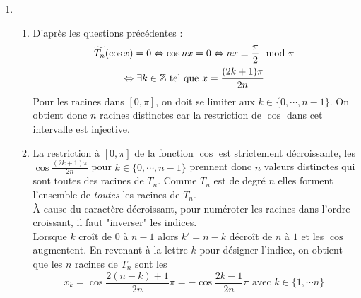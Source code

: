 \begin{enumerate}
\begin{enumerate}
\end{enumerate}
\item \begin{enumerate}
 \item D'après les questions précédentes : 
\begin{multline*}
 \widetilde{T_n}(\cos x) = 0 \Leftrightarrow \cos nx= 0
\Leftrightarrow nx \equiv \frac{\pi}{2} \mod \pi \\
\Leftrightarrow \exists k\in \mathbb{Z} \text{ tel que } x=\frac{(2k+1)\pi}{2n}
\end{multline*}
Pour les racines dans $[0,\pi]$, on doit se limiter aux $k\in\{0, \cdots,n-1\}$. On obtient donc $n$ racines distinctes car la restriction de $\cos$ dans cet intervalle est injective.
\item La restriction à $[0,\pi]$ de la fonction $\cos$ est strictement décroissante, les $\cos \frac{(2k+1)\pi}{2n}$ pour $k\in\{0, \cdots,n-1\}$ prennent donc $n$ valeurs distinctes qui sont toutes des racines de $T_n$. Comme $T_n$ est de degré $n$ elles forment l'ensemble de \emph{toutes} les racines de $T_n$.\\
\`A cause du caractère décroissant, pour numéroter les racines dans l'ordre croissant, il faut "inverser" les indices.\\
Lorsque $k$ croît de $0$ à $n-1$ alors $k'=n-k$ décroît de $n$ à $1$ et les $\cos$ augmentent. En revenant à la lettre $k$ pour désigner l'indice, on obtient que les $n$ racines de $T_n$ sont les
\begin{displaymath}
 x_k = \cos \frac{2(n-k)+1}{2n}\pi = - \cos\frac{2k-1}{2n}\pi \text{ avec } k\in\{1,\cdots n\}
\end{displaymath}

\end{enumerate}
\end{enumerate}

